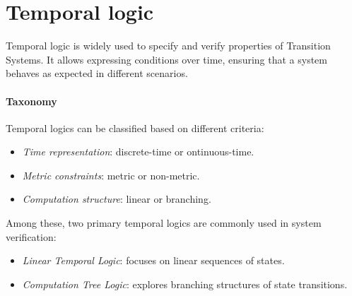 \section{Temporal logic}

Temporal logic is widely used to specify and verify properties of Transition Systems. 
It allows expressing conditions over time, ensuring that a system behaves as expected in different scenarios.

\paragraph*{Taxonomy}
Temporal logics can be classified based on different criteria:
\begin{itemize}
    \item \textit{Time representation}: discrete-time or ontinuous-time.
    \item \textit{Metric constraints}: metric or non-metric.
    \item \textit{Computation structure}: linear or branching.
\end{itemize}
\noindent Among these, two primary temporal logics are commonly used in system verification:
\begin{itemize}
    \item \textit{Linear Temporal Logic}: focuses on linear sequences of states.
    \item \textit{Computation Tree Logic}: explores branching structures of state transitions.
\end{itemize}